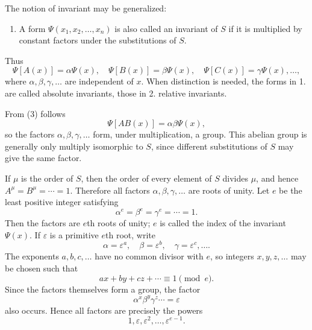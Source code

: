 \documentclass[11pt]{article}
\begin{document}
The notion of invariant may be generalized:
\begin{enumerate}[label=\arabic*.,leftmargin=2.2em,start=2]
\item A form $\Psi(x_1,x_2,\ldots,x_n)$ is also called an invariant of $S$ if it is multiplied by constant factors under the substitutions of $S$.
\end{enumerate}
Thus
\begin{equation}
\Psi[A(x)]=\alpha\Psi(x),
\quad
\Psi[B(x)]=\beta\Psi(x),
\quad
\Psi[C(x)]=\gamma\Psi(x),\ldots,
\tag{3}
\end{equation}
where $\alpha,\beta,\gamma,\ldots$ are independent of $x$. When distinction is needed, the forms in 1. are called absolute invariants, those in 2. relative invariants.

From (3) follows
\begin{equation}
\Psi[AB(x)]=\alpha\beta\Psi(x),
\tag{4}
\end{equation}
so the factors $\alpha,\beta,\gamma,\ldots$ form, under multiplication, a group. This abelian group is generally only multiply isomorphic to $S$, since different substitutions of $S$ may give the same factor.

If $\mu$ is the order of $S$, then the order of every element of $S$ divides $\mu$, and hence $A^\mu=B^\mu=\cdots=1$. Therefore all factors $\alpha,\beta,\gamma,\ldots$ are roots of unity. Let $e$ be the least positive integer satisfying
\begin{equation}
\alpha^e=\beta^e=\gamma^e=\cdots=1.
\tag{5}
\end{equation}
Then the factors are $e$th roots of unity; $e$ is called the index of the invariant $\Psi(x)$. If $\varepsilon$ is a primitive $e$th root, write
\[
\alpha=\varepsilon^a,
\quad
\beta=\varepsilon^b,
\quad
\gamma=\varepsilon^c,
\ldots.
\]
The exponents $a,b,c,\ldots$ have no common divisor with $e$, so integers $x,y,z,\ldots$ may be chosen such that
\[
ax+by+cz+\cdots\equiv1\pmod e.
\]
Since the factors themselves form a group, the factor
\[
\alpha^x\beta^y\gamma^z\cdots=\varepsilon
\]
also occurs. Hence all factors are precisely the powers
\[
1,\varepsilon,\varepsilon^2,\ldots,\varepsilon^{e-1}.
\]
\end{document}
